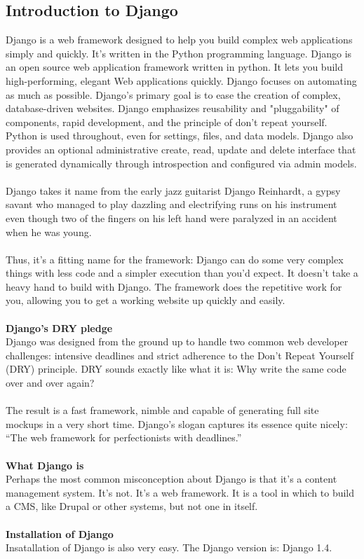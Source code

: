 \subsection{Introduction to Django}
Django is a web framework designed to help you build complex web applications simply and quickly. It’s written in the Python programming language. Django is an open source web application framework written in python. It lets you build high-performing, elegant Web applications quickly. Django focuses on automating as much as possible. Django's primary goal is to ease the creation of complex, database-driven websites. Django emphasizes reusability and "pluggability" of components, rapid development, and the principle of don't repeat yourself. Python is used throughout, even for settings, files, and data models. Django also provides an optional administrative create, read, update and delete interface that is generated dynamically through introspection and configured via admin models.\\\\
Django takes it name from the early jazz guitarist Django Reinhardt, a gypsy savant who managed to play dazzling and electrifying runs on his instrument even though two of the fingers on his left hand were paralyzed in an accident when he was young.\\\\
Thus, it’s a fitting name for the framework: Django can do some very complex things with less code and a simpler execution than you’d expect. It doesn’t take a heavy hand to build with Django. The framework does the repetitive work for you, allowing you to get a working website up quickly and easily.\\\\
{\bf Django's DRY pledge}\\
Django was designed from the ground up to handle two common web developer challenges: intensive deadlines and strict adherence to the Don’t Repeat Yourself (DRY) principle. DRY sounds exactly like what it is: Why write the same code over and over again?\\\\
The result is a fast framework, nimble and capable of generating full site mockups in a very short time. Django’s slogan captures its essence quite nicely: “The web framework for perfectionists with deadlines.”\\\\
{\bf What Django is}\\
Perhaps the most common misconception about Django is that it’s a content management system. It’s not. It’s a web framework. It is a tool in which to build a CMS, like Drupal or other systems, but not one in itself.\\\\
{\bf Installation of Django}\\
Insatallation of Django is also very easy.
The Django version is: Django 1.4.\\



